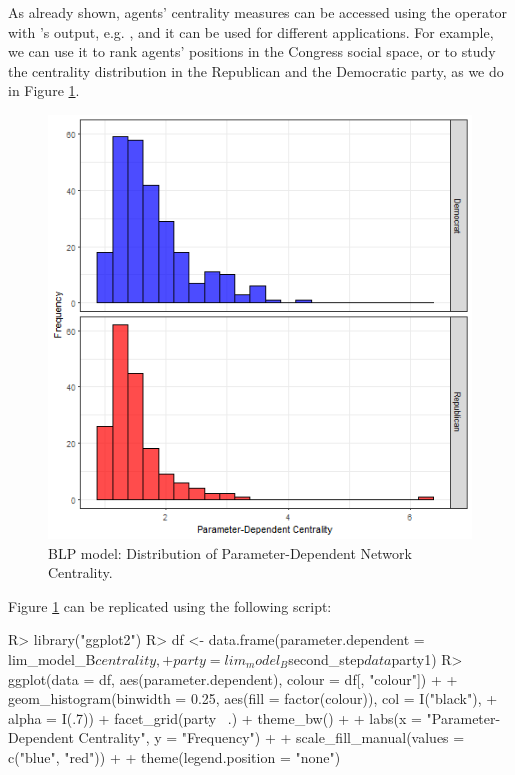\documentclass[nojss]{jss}
\begin{document}
As already shown, agents' centrality measures can be accessed using the operator \code{\$} with 's output, e.g. , and it can be used for different applications. For example, we can use it to rank agents' positions in the Congress social space, or to study the centrality distribution in the Republican and the Democratic party, as we do in Figure \ref{fig:figure1}. 
\begin{figure}[t!]
\centering
\includegraphics{Figure1}
\caption{\label{fig:figure1} BLP model: Distribution of Parameter-Dependent Network Centrality.}
\end{figure}
Figure \ref{fig:figure1} can be replicated using the following script:
\begin{CodeChunk}
\begin{CodeInput}
R> library("ggplot2")
R> df <- data.frame(parameter.dependent = lim_model_B$centrality,
+    party = lim_model_B$second_step$data$party1)
R> ggplot(data = df, aes(parameter.dependent), colour = df[, "colour"]) +
+    geom_histogram(binwidth = 0.25, aes(fill = factor(colour)), col = I("black"),
+    alpha = I(.7)) + facet_grid(party ~.) + theme_bw() + 
+    labs(x = "Parameter-Dependent Centrality", y = "Frequency") +
+    scale_fill_manual(values = c("blue", "red")) + 
+    theme(legend.position = "none")
\end{CodeInput}
\end{CodeChunk}
\end{document}
